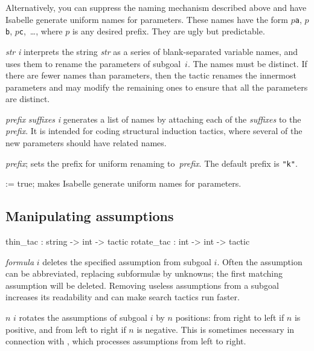 Alternatively, you can suppress the naming mechanism described above and
have Isabelle generate uniform names for parameters.  These names have the
form $p${\tt a}, $p${\tt b}, $p${\tt c},~\ldots, where $p$ is any desired
prefix.  They are ugly but predictable.

\begin{ttdescription}
\item[\ttindexbold{rename_tac} {\it str} {\it i}] 
interprets the string {\it str} as a series of blank-separated variable
names, and uses them to rename the parameters of subgoal~$i$.  The names
must be distinct.  If there are fewer names than parameters, then the
tactic renames the innermost parameters and may modify the remaining ones
to ensure that all the parameters are distinct.

\item[\ttindexbold{rename_last_tac} {\it prefix} {\it suffixes} {\it i}] 
generates a list of names by attaching each of the {\it suffixes\/} to the 
{\it prefix}.  It is intended for coding structural induction tactics,
where several of the new parameters should have related names.

\item[\ttindexbold{Logic.set_rename_prefix} {\it prefix};] 
sets the prefix for uniform renaming to~{\it prefix}.  The default prefix
is {\tt"k"}.

\item[\ttindexbold{Logic.auto_rename} := true;] 
makes Isabelle generate uniform names for parameters. 
\end{ttdescription}


\subsection{Manipulating assumptions}
\begin{ttbox} 
thin_tac   : string -> int -> tactic
rotate_tac : int -> int -> tactic
\end{ttbox}
\begin{ttdescription}
\item[\ttindexbold{thin_tac} {\it formula} $i$]  
deletes the specified assumption from subgoal $i$.  Often the assumption
can be abbreviated, replacing subformul{\ae} by unknowns; the first matching
assumption will be deleted.  Removing useless assumptions from a subgoal
increases its readability and can make search tactics run faster.

\item[\ttindexbold{rotate_tac} $n$ $i$]  
rotates the assumptions of subgoal $i$ by $n$ positions: from right to left
if $n$ is positive, and from left to right if $n$ is negative.  This is 
sometimes necessary in connection with , which 
processes assumptions from left to right.
\end{ttdescription}


